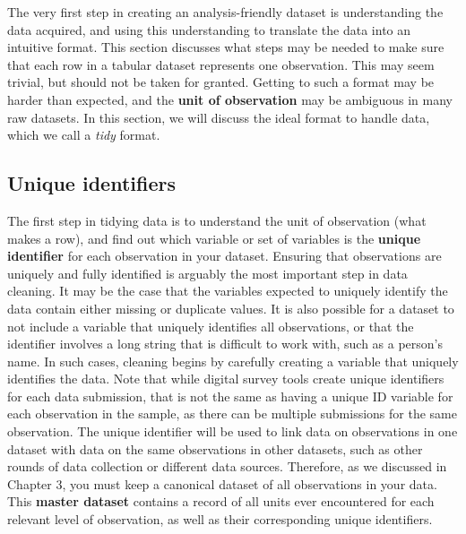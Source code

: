 The very first step in creating an analysis-friendly dataset
is understanding the data acquired,
and using this understanding to translate the data into an intuitive format.
This section discusses what steps may be needed to make sure that each row
in a tabular dataset 
represents one observation.
This may seem trivial, but should not be taken for granted.
Getting to such a format may be harder than expected,
and the \textbf{unit of observation}
may be ambiguous in many raw datasets.
In this section, we will discuss the ideal format to handle data,
which we call a \textit{tidy} format.


\subsection{Unique identifiers}
The first step in tidying data is to understand the unit of observation
(what makes a row),
and find out which variable or set of variables is the \textbf{unique identifier} for each observation in your dataset.
Ensuring that observations are uniquely and fully identified
is arguably the most important step in data cleaning.
It may be the case that the variables expected to uniquely identify 
the data contain either missing or duplicate values.
It is also possible for a dataset to not include a variable that uniquely identifies all observations, 
or that the identifier involves a long string that is difficult to work with, such as a person's name.
In such cases, cleaning begins by carefully creating a variable that uniquely identifies the data.
Note that while digital survey tools create unique identifiers for each data submission,
that is not the same as having a unique ID variable for each observation in the sample,
as there can be multiple submissions for the same observation.
The unique identifier will be used to link data on observations in one dataset 
with data on the same observations in other datasets, 
such as other rounds of data collection or different data sources.
Therefore, as we discussed in Chapter 3, 
you must keep a canonical dataset of all observations in your data.
This \textbf{master dataset}
contains a record of all units ever encountered for each relevant level of observation,
as well as their corresponding unique identifiers.

